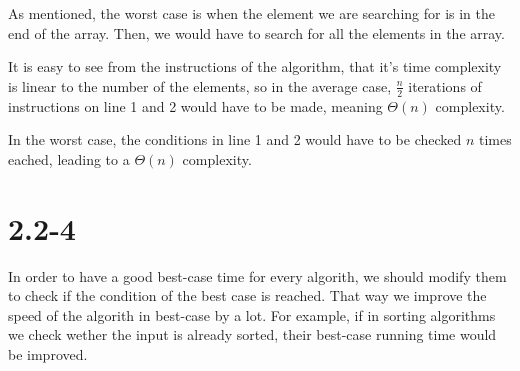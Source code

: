 \documentclass{article}
\begin{document}
As mentioned, the worst case is when the element we are searching for is in the end of the array. Then, we would have to search for all the elements in the array.

It is easy to see from the instructions of the algorithm, that it's time complexity is linear to the number of the elements, so in the average case, $\frac{n}{2}$ iterations of instructions on line 1 and 2 would have to be made, meaning $\Theta(n)$ complexity.

In the worst case, the conditions in line 1 and 2 would have to be checked $n$ times eached, leading to a $\Theta(n)$ complexity. 

\section*{2.2-4}
In order to have a good best-case time for every algorith, we should modify them to check if the condition of the best case is reached. That way we improve the speed of the algorith in best-case by a lot. For example, if in sorting algorithms we check wether the input is already sorted, their best-case running time would be improved.
\end{document}
